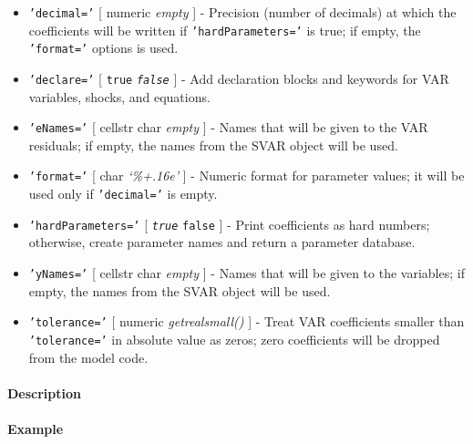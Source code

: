 \begin{itemize}
\item
  \texttt{'decimal='} {[} numeric \textbar{} \emph{empty} {]} -
  Precision (number of decimals) at which the coefficients will be
  written if \texttt{'hardParameters='} is true; if empty, the
  \texttt{'format='} options is used.
\item
  \texttt{'declare='} {[} \texttt{true} \textbar{} \emph{\texttt{false}}
  {]} - Add declaration blocks and keywords for VAR variables, shocks,
  and equations.
\item
  \texttt{'eNames='} {[} cellstr \textbar{} char \textbar{} \emph{empty}
  {]} - Names that will be given to the VAR residuals; if empty, the
  names from the SVAR object will be used.
\item
  \texttt{'format='} {[} char \textbar{} \emph{`\%+.16e'} {]} - Numeric
  format for parameter values; it will be used only if
  \texttt{'decimal='} is empty.
\item
  \texttt{'hardParameters='} {[} \emph{\texttt{true}} \textbar{}
  \texttt{false} {]} - Print coefficients as hard numbers; otherwise,
  create parameter names and return a parameter database.
\item
  \texttt{'yNames='} {[} cellstr \textbar{} char \textbar{} \emph{empty}
  {]} - Names that will be given to the variables; if empty, the names
  from the SVAR object will be used.
\item
  \texttt{'tolerance='} {[} numeric \textbar{} \emph{getrealsmall()} {]}
  - Treat VAR coefficients smaller than \texttt{'tolerance='} in
  absolute value as zeros; zero coefficients will be dropped from the
  model code.
\end{itemize}

\paragraph{Description}\label{description}

\paragraph{Example}\label{example}



